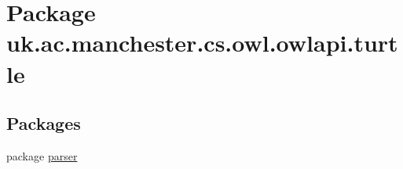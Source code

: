 \hypertarget{namespaceuk_1_1ac_1_1manchester_1_1cs_1_1owl_1_1owlapi_1_1turtle}{\section{Package uk.\-ac.\-manchester.\-cs.\-owl.\-owlapi.\-turtle}
\label{namespaceuk_1_1ac_1_1manchester_1_1cs_1_1owl_1_1owlapi_1_1turtle}
}
\subsection*{Packages}
\begin{DoxyCompactItemize}
\item 
package \hyperlink{namespaceuk_1_1ac_1_1manchester_1_1cs_1_1owl_1_1owlapi_1_1turtle_1_1parser}{parser}
\end{DoxyCompactItemize}
